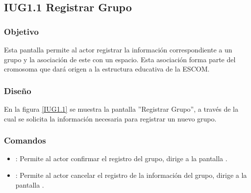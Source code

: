 \subsection{IUG1.1 Registrar Grupo}

\subsubsection{Objetivo}
	Esta pantalla permite al actor registrar la información correspondiente a un grupo y la asociación de este con un espacio. Esta asociación forma parte del cromosoma que dará origen a la estructura educativa de la ESCOM.

\subsubsection{Diseño}

    En la figura \ref{IUG1.1} se muestra la pantalla ''Registrar Grupo'', a través de la cual se solicita la información necesaria para registrar un nuevo grupo.
 

\subsubsection{Comandos}
    \begin{itemize}
	\item {}: Permite al actor confirmar el registro del grupo, dirige a la pantalla .
	
	\item {}: Permite al actor cancelar el registro de la información del grupo, dirige a la pantalla .
    \end{itemize}
